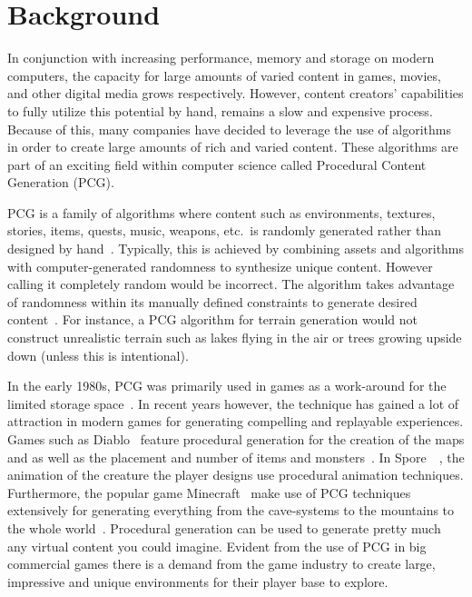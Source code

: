 \section{Background}

In conjunction with increasing performance, memory and storage on modern computers, the capacity for large amounts of varied content in games, movies, and other digital media grows respectively.
However, content creators' capabilities to fully utilize this potential by hand, remains a slow and expensive process.
Because of this, many companies have decided to leverage the use of algorithms in order to create large amounts of rich and varied content.
These algorithms are part of an exciting field within computer science called Procedural Content Generation (PCG).

PCG is a family of algorithms where content such as environments, textures, stories, items, quests, music, weapons, etc.\ is randomly generated rather than designed by hand~\cite[p.1]{PCG_in_games}.
Typically, this is achieved by combining assets and algorithms with computer-generated randomness to synthesize unique content.
However calling it completely random would be incorrect.
The algorithm takes advantage of randomness within its manually defined constraints to generate desired content~\cite{Gamasutra}.
For instance, a PCG algorithm for terrain generation would not construct unrealistic terrain such as lakes flying in the air or trees growing upside down (unless this is intentional).
	
In the early 1980s, PCG was primarily used in games as a work-around for the limited storage space~\cite[p.4]{PCG_in_games}.
In recent years however, the technique has gained a lot of attraction in modern games for generating compelling and replayable experiences.
Games such as Diablo~\cite{diablo} feature procedural generation for the creation of the maps and as well as the placement and number of items and monsters~\cite[p.4]{PCG_in_games}.
In Spore~\cite{spore}~, the animation of the creature the player designs use procedural animation techniques\cite[p.4]{PCG_in_games}.
Furthermore, the popular game Minecraft~\cite{minecraft} make use of PCG techniques extensively for generating everything from the cave-systems to the mountains to the whole world~\cite[p.4]{PCG_in_games}.
Procedural generation can be used to generate pretty much any virtual content you could imagine.
Evident from the use of PCG in big commercial games there is a demand from the game industry to create large, impressive and unique environments for their player base to explore.

